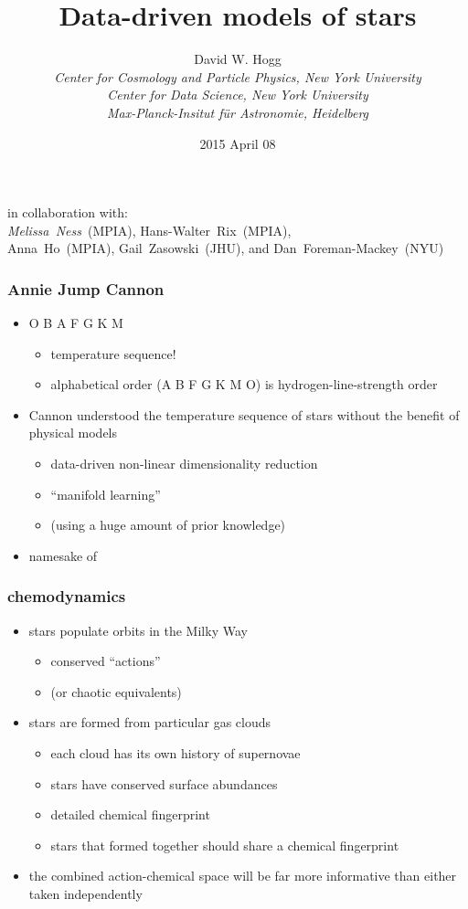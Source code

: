 \documentclass[pdftex]{beamer}
\title{Data-driven models of stars}
\author[David W. Hogg (NYU)]{David W. Hogg \\
  \textsl{\small Center for Cosmology and Particle Physics,
                 New York University} \\
  \textsl{\small Center for Data Science,
                 New York University} \\
  \textsl{\small Max-Planck-Insitut f\"ur Astronomie, Heidelberg}}
\date{2015 April 08}
\newcommand{\teff}{T_{\mathrm{eff}}}
\newcommand{\logg}{\log g}
\newcommand{\feh}{[\mathrm{Fe / H}]}
\newcommand{\conclusions}{%
\begin{frame}
  \frametitle{conclusions}
  \begin{itemize}
  \item A data-driven label transfer system provides \apogee\ stars with labels comparable in quality to the \apogee\ physics-driven pipeline.
    \begin{itemize}
    \item \tc\ (Ness \etal, \textit{ApJ} submitted)
    \item ``labels'' $\equiv (\teff,\logg,\feh)$
    \end{itemize}
  \item \tc\ uses \emph{no physical model of stars}.
  \item The method and the training set are both immature zeroth steps.
  \item There is hope for a consistent system of stellar parameters and chemical abundances across all future surveys.
    \begin{itemize}
    \item \gaia\ \& \project{Gaia-ESO}
    \item \sdssiii\ \project{SEGUE} \& \apogee; \sdssiv\ \project{APOGEE-2}
    \item \project{HERMES} / \project{GALAH}
    \end{itemize}
  \item \texttt{\giturl}
  \end{itemize}
\end{frame}}
\begin{document}
\begin{frame}
  \titlepage
  in collaboration with:\\
  \emph{Melissa~Ness}~(MPIA), {\small Hans-Walter~Rix~(MPIA), \\
  Anna~Ho~(MPIA), Gail~Zasowski~(JHU), and Dan~Foreman-Mackey~(NYU)}
\end{frame}


\begin{frame}
  \frametitle{Annie Jump Cannon}
  \begin{itemize}
  \item O B A F G K M
    \begin{itemize}
    \item temperature sequence!
    \item alphabetical order (A B F G K M O) is hydrogen-line-strength order
    \end{itemize}
  \item Cannon understood the temperature sequence of stars without the benefit of physical models
    \begin{itemize}
    \item data-driven non-linear dimensionality reduction
    \item ``manifold learning''
    \item (using a huge amount of prior knowledge)
    \end{itemize}
  \item namesake of \tc
  \end{itemize}
\end{frame}

\begin{frame}
  \frametitle{chemodynamics}
  \begin{itemize}
  \item stars populate orbits in the Milky Way
    \begin{itemize}
    \item conserved ``actions''
    \item (or chaotic equivalents)
    \end{itemize}
  \item stars are formed from particular gas clouds
    \begin{itemize}
    \item each cloud has its own history of supernovae
    \item stars have conserved surface abundances
    \item detailed chemical fingerprint
    \item stars that formed together should share a chemical fingerprint
    \end{itemize}
  \item the combined action-chemical space will be far more
    informative than either taken independently
  \end{itemize}
\end{frame}
\end{document}
